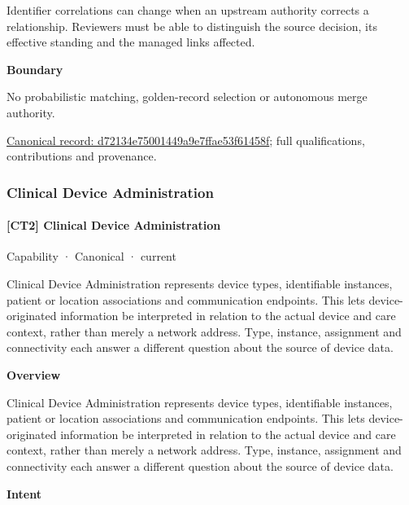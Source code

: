 Identifier correlations can change when an upstream authority corrects a relationship. Reviewers must be able to distinguish the source decision, its effective standing and the managed links affected.



\textbf{Boundary}



No probabilistic matching, golden-record selection or autonomous merge authority.


{\footnotesize \href{../../../../continuum/strategy/capability/feature/d72134e75001449a9e7ffae53f61458f.md}{Canonical record: d72134e75001449a9e7ffae53f61458f}; full qualifications, contributions and provenance.}\par
\subsubsection{Clinical Device Administration}

\paragraph{[CT2] Clinical Device Administration}

\label{element:31bcd6fda0d14cc8b992cdca39a3cbed}
{\small Capability · Canonical · current}\par

Clinical Device Administration represents device types, identifiable instances, patient or location associations and communication endpoints. This lets device-originated information be interpreted in relation to the actual device and care context, rather than merely a network address. Type, instance, assignment and connectivity each answer a different question about the source of device data.



\textbf{Overview}



Clinical Device Administration represents device types, identifiable instances, patient or location associations and communication endpoints. This lets device-originated information be interpreted in relation to the actual device and care context, rather than merely a network address. Type, instance, assignment and connectivity each answer a different question about the source of device data.



\textbf{Intent}



